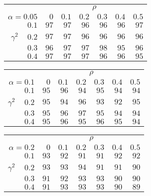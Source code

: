 \begin{tabular}{r|rrrrrr}
\hline\hline
 &\multicolumn{6}{c}{$\rho$} \\ 
 $\alpha = 0.05$ & $0$ & $0.1$ & $0.2$ & $0.3$ & $0.4$ & $0.5$ \\ 
 \hline$0.1$ & $97$ & $97$ & $96$ & $96$ & $96$ & $97$\\ 
$\gamma^2\;\;\;$ $0.2$ & $97$ & $97$ & $96$ & $96$ & $96$ & $96$\\ 
$0.3$ & $96$ & $97$ & $97$ & $98$ & $95$ & $96$\\ 
$0.4$ & $97$ & $97$ & $97$ & $96$ & $96$ & $95$\\ 
 \hline 
 \end{tabular}
 
 \vspace{2em} 
 
\begin{tabular}{r|rrrrrr}
\hline\hline
 &\multicolumn{6}{c}{$\rho$} \\ 
 $\alpha = 0.1$ & $0$ & $0.1$ & $0.2$ & $0.3$ & $0.4$ & $0.5$ \\ 
 \hline$0.1$ & $95$ & $96$ & $94$ & $95$ & $94$ & $94$\\ 
$\gamma^2\;\;\;$ $0.2$ & $95$ & $94$ & $96$ & $93$ & $92$ & $95$\\ 
$0.3$ & $95$ & $96$ & $97$ & $95$ & $94$ & $94$\\ 
$0.4$ & $95$ & $96$ & $95$ & $96$ & $95$ & $94$\\ 
 \hline 
 \end{tabular}
 
 \vspace{2em} 
 
\begin{tabular}{r|rrrrrr}
\hline\hline
 &\multicolumn{6}{c}{$\rho$} \\ 
 $\alpha = 0.2$ & $0$ & $0.1$ & $0.2$ & $0.3$ & $0.4$ & $0.5$ \\ 
 \hline$0.1$ & $93$ & $92$ & $91$ & $91$ & $92$ & $92$\\ 
$\gamma^2\;\;\;$ $0.2$ & $93$ & $93$ & $94$ & $91$ & $91$ & $90$\\ 
$0.3$ & $91$ & $92$ & $93$ & $93$ & $90$ & $90$\\ 
$0.4$ & $91$ & $93$ & $93$ & $93$ & $90$ & $89$\\ 
 \hline 
 \end{tabular}